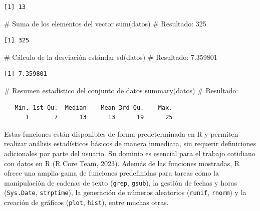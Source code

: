 \documentclass[
  spanish,
  a4paper,
  DIV=11,
  numbers=noendperiod,
  onepage,
  openany]{scrreprt}
\newenvironment{Shaded}{\begin{snugshade}}{\end{snugshade}}
\newcommand{\CommentTok}[1]{\textcolor[rgb]{0.37,0.37,0.37}{#1}}
\newcommand{\FunctionTok}[1]{\textcolor[rgb]{0.28,0.35,0.67}{#1}}
\newcommand{\NormalTok}[1]{\textcolor[rgb]{0.00,0.23,0.31}{#1}}
\begin{document}
\begin{verbatim}
[1] 13
\end{verbatim}

\begin{Shaded}
\begin{Highlighting}[]
\CommentTok{\# Suma de los elementos del vector}
\FunctionTok{sum}\NormalTok{(datos)             }\CommentTok{\# Resultado: 325}
\end{Highlighting}
\end{Shaded}

\begin{verbatim}
[1] 325
\end{verbatim}

\begin{Shaded}
\begin{Highlighting}[]
\CommentTok{\# Cálculo de la desviación estándar}
\FunctionTok{sd}\NormalTok{(datos)        }\CommentTok{\# Resultado: 7.359801}
\end{Highlighting}
\end{Shaded}

\begin{verbatim}
[1] 7.359801
\end{verbatim}

\begin{Shaded}
\begin{Highlighting}[]
\CommentTok{\# Resumen estadístico del conjunto de datos}
\FunctionTok{summary}\NormalTok{(datos)   }\CommentTok{\# Resultado:}
\end{Highlighting}
\end{Shaded}

\begin{verbatim}
   Min. 1st Qu.  Median    Mean 3rd Qu.    Max. 
      1       7      13      13      19      25 
\end{verbatim}

Estas funciones están disponibles de forma predeterminada en R y
permiten realizar análisis estadísticos básicos de manera inmediata, sin
requerir definiciones adicionales por parte del usuario. Su dominio es
esencial para el trabajo cotidiano con datos en R (R Core Team, 2023).
Además de las funciones mostradas, R ofrece una amplia gama de funciones
predefinidas para tareas como la manipulación de cadenas de texto
(\texttt{grep}, \texttt{gsub}), la gestión de fechas y horas
(\texttt{Sys.Date}, \texttt{strptime}), la generación de números
aleatorios (\texttt{runif}, \texttt{rnorm}) y la creación de gráficos
(\texttt{plot}, \texttt{hist}), entre muchas otras.
\end{document}
